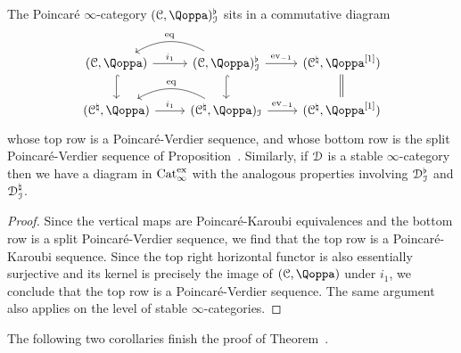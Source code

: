 \begin{lemma}
\label{lemma:PV-sequence-3}%
The Poincaré $\infty$-category $(\C,\QF)^{\flat}_\I$ sits in a commutative diagram
\[
\begin{tikzcd}
	(\C,\QF) \ar[r,"i_1"] \ar[d, hook] & (\C,\QF)^{\flat}_\I \ar[r,"\ev_{-1}"] \ar[l,bend right,"\equ"']  \ar[d,hook] & (\C^\natural,\QF\qshift{1}) \ar[d, equal] \\
	(\C^\natural,\QF) \ar[r,"i_1"]& (\C^\natural,\QF)_\I \ar[r,"\ev_{-1}"] \ar[l,bend right,"\equ"'] & (\C^\natural,\QF\qshift{1})
\end{tikzcd}
\]
whose top row is a Poincaré-Verdier sequence, and whose bottom row is the split Poincaré-Verdier sequence of
Proposition~.
Similarly, if $\mathcal{D}$ is a stable $\infty$-category then we have a diagram in $\mathrm{Cat}_\infty^{\mathrm{ex}}$ with the analogous properties involving $\mathcal{D}^{\flat}_{\mathcal{I}}$ and $\mathcal{D}^{\natural}_{\mathcal{I}}$.
\end{lemma}
\begin{proof}
Since the vertical maps are Poincar\'e-Karoubi equivalences and the bottom row is a split Poincaré-Verdier sequence, we find that the top row is a Poincar\'e-Karoubi sequence. Since the top right horizontal functor is also essentially surjective and its kernel is precisely the image of $(\C,\QF)$ under $i_1$,
we conclude that the top row is a Poincaré-Verdier sequence. The same argument also applies on the level of stable $\infty$-categories.
\end{proof}

The following two corollaries finish the proof of Theorem~.


